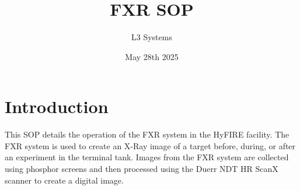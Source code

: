 \documentclass{article}
\title{FXR SOP}
\author{L3 Systems}
\date{May 28th 2025}
\begin{document}
\maketitle

\section{Introduction}

This SOP details the operation of the FXR system in the HyFIRE facility. The FXR system is used to create an X-Ray image of a target before, during, or after an experiment in the terminal tank. 
Images from the FXR system are collected using phosphor screens and then processed using the Duerr NDT HR ScanX scanner to create a digital image. 
\end{document}
